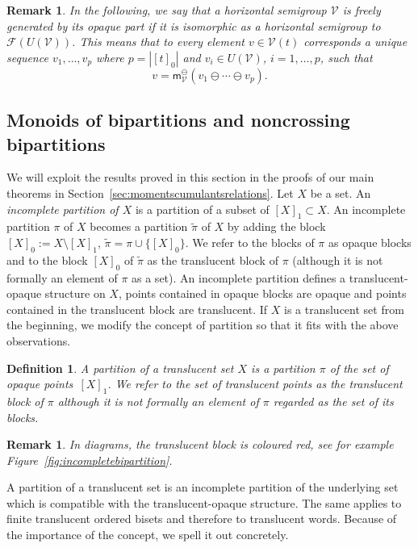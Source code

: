 \documentclass[pdftex]{sigma}
\newcommand\hp{\mathsf{m}^{\ominus}}
\numberwithin{equation}{section}
\newtheorem{Definition}[Theorem]{Definition}
\newtheorem{Remark}[Theorem]{Remark}
\begin{document}
\begin{Remark}\label{rk:freelygenerated}
 In the following, we say that a horizontal semigroup $\mathcal{V}$ is {\it freely generated by its opaque part} if it is isomorphic as a horizontal semigroup to $\mathcal{F}(U(\mathcal{V}))$. This means that to every element $v \in \mathcal{V}(t)$ corresponds a unique sequence $v_1,\dots,v_p$ where $p=|[t]_0|$ and $v_i \in U(\mathcal{V})$, $i=1,\dots,p$, such that
 \[
 v = \hp_{\mathcal{V}}(v_1\ominus \cdots \ominus v_p).
 \]
\end{Remark}

\subsection{Monoids of bipartitions and noncrossing bipartitions}\label{subsec:incompletebinoncrossing}

We will exploit the results proved in this section in the proofs of our main theorems in Section~\ref{sec:momentscumulantsrelations}.
Let $X$ be a set. An {\it incomplete partition of $X$} is a partition of a subset of $[X]_1\subset X$. An incomplete partition $\pi$ of $X$ becomes a partition $\widetilde \pi$ of $X$ by adding the block $[X]_0:=X\setminus [X]_1$, $\widetilde \pi=\pi\cup \{[X]_0\}$. We refer to the blocks of $\pi$ as opaque blocks and to the block $[X]_0$ of $\widetilde \pi$ as the translucent block of $\pi$ (although it is not formally an element of $\pi$ as a set). An incomplete partition defines a translucent-opaque structure on $X$, points contained in opaque blocks are opaque and points contained in the translucent block are translucent. If $X$ is a translucent set from the beginning, we modify the concept of partition so that it fits with the above observations.

\begin{Definition}
 A {\it partition of a translucent set} $X$ is a partition $\pi$ of the set of opaque points~$[X]_1$. We refer to the set of translucent points as the {\it translucent block} of $\pi$ although it is not formally an element of $\pi$ regarded as the set of its blocks.
\end{Definition}

\begin{Remark}
 In diagrams, the translucent block is coloured red, see for example Figure~\ref{fig:incompletebipartition}.
\end{Remark}

A partition of a translucent set is an incomplete partition of the underlying set which is compatible with the translucent-opaque structure.
The same applies to finite translucent ordered bisets and therefore to translucent words. Because of the importance of the concept, we spell it out concretely.
\end{document}
